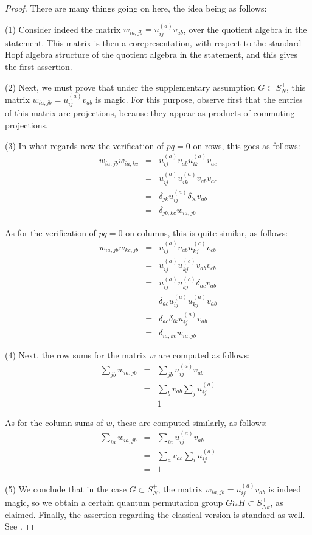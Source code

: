 \documentclass[12pt]{amsbook}
\begin{document}
\begin{proof}
There are many things going on here, the idea being as follows:

\medskip

(1) Consider indeed the matrix $w_{ia,jb}=u_{ij}^{(a)}v_{ab}$, over the quotient algebra in the statement. This matrix is then a corepresentation, with respect to the standard Hopf algebra structure of the quotient algebra in the statement, and this gives the first assertion.

\medskip

(2) Next, we must prove that under the supplementary assumption $G\subset S_N^+$, this matrix $w_{ia,jb}=u_{ij}^{(a)}v_{ab}$ is magic. For this purpose, observe first that the entries of this matrix are projections, because they appear as products of commuting projections.

\medskip

(3) In what regards now the verification of $pq=0$ on rows, this goes as follows:
\begin{eqnarray*}
w_{ia,jb}w_{ia,kc}
&=&u_{ij}^{(a)}v_{ab}u_{ik}^{(a)}v_{ac}\\
&=&u_{ij}^{(a)}u_{ik}^{(a)}v_{ab}v_{ac}\\
&=&\delta_{jk}u_{ij}^{(a)}\delta_{bc}v_{ab}\\
&=&\delta_{jb,kc}w_{ia,jb}
\end{eqnarray*}

As for the verification of $pq=0$ on columns, this is quite similar, as follows:
\begin{eqnarray*}
w_{ia,jb}w_{kc,jb}
&=&u_{ij}^{(a)}v_{ab}u_{kj}^{(c)}v_{cb}\\
&=&u_{ij}^{(a)}u_{kj}^{(c)}v_{ab}v_{cb}\\
&=&u_{ij}^{(a)}u_{kj}^{(c)}\delta_{ac}v_{ab}\\
&=&\delta_{ac}u_{ij}^{(a)}u_{kj}^{(a)}v_{ab}\\
&=&\delta_{ac}\delta_{ik}u_{ij}^{(a)}v_{ab}\\
&=&\delta_{ia,kc}w_{ia,jb}
\end{eqnarray*}

(4) Next, the row sums for the matrix $w$ are computed as follows:
\begin{eqnarray*}
\sum_{jb}w_{ia,jb}
&=&\sum_{jb}u_{ij}^{(a)}v_{ab}\\
&=&\sum_bv_{ab}\sum_ju_{ij}^{(a)}\\
&=&1
\end{eqnarray*}

As for the column sums of $w$, these are computed similarly, as follows:
\begin{eqnarray*}
\sum_{ia}w_{ia,jb}
&=&\sum_{ia}u_{ij}^{(a)}v_{ab}\\
&=&\sum_av_{ab}\sum_iu_{ij}^{(a)}\\
&=&1
\end{eqnarray*}

(5) We conclude that in the case $G\subset S_N^+$, the matrix $w_{ia,jb}=u_{ij}^{(a)}v_{ab}$ is indeed magic, so we obtain a certain quantum permutation group $G\wr_*H\subset S_{Nk}^+$, as claimed. Finally, the assertion regarding the classical version is standard as well. See \cite{bi2}.
\end{proof}
\end{document}
